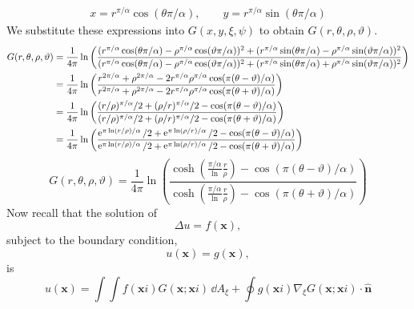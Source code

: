 {\begin{Solution}
\begin{gather*}
    x = r^{\pi/\alpha} \cos(\theta \pi / \alpha), \qquad
    y = r^{\pi/\alpha} \sin(\theta \pi / \alpha)
  \end{gather*}
  We substitute these expressions into $G(x,y,\xi,\psi)$ to obtain
  $G(r,\theta,\rho,\vartheta)$.
  \begin{align*}
    G(r,\theta,\rho,\vartheta)
    &= \frac{1}{4\pi} \ln \left(
      \frac{ ( r^{\pi/\alpha} \cos(\theta \pi/\alpha)
        - \rho^{\pi/\alpha} \cos(\vartheta \pi / \alpha) )^2
        + ( r^{\pi/\alpha} \sin(\theta \pi/\alpha)
        - \rho^{\pi/\alpha} \sin(\vartheta \pi / \alpha) )^2 }
      { ( r^{\pi/\alpha} \cos(\theta \pi/\alpha)
        - \rho^{\pi/\alpha} \cos(\vartheta \pi / \alpha) )^2
        + ( r^{\pi/\alpha} \sin(\theta \pi/\alpha)
        + \rho^{\pi/\alpha} \sin(\vartheta \pi / \alpha) )^2 } \right)\\
    &= \frac{1}{4\pi} \ln \left(
      \frac{ r^{2 \pi / \alpha} + \rho^{2 \pi / \alpha}
        - 2 r^{\pi/\alpha} \rho^{\pi/\alpha} 
        \cos( \pi(\theta-\vartheta) / \alpha ) }
      { r^{2 \pi / \alpha} + \rho^{2 \pi / \alpha}
        - 2 r^{\pi/\alpha} \rho^{\pi/\alpha} 
        \cos( \pi(\theta+\vartheta) / \alpha ) } \right) \\
    &= \frac{1}{4\pi} \ln \left(
      \frac{ (r/\rho)^{\pi/\alpha} / 2 + (\rho/r)^{\pi/\alpha} / 2
        - \cos( \pi(\theta-\vartheta) / \alpha ) }
      { (r/\rho)^{\pi/\alpha} / 2 + (\rho/r)^{\pi/\alpha} / 2
        - \cos( \pi(\theta+\vartheta) / \alpha ) } \right) \\
    &= \frac{1}{4\pi} \ln \left(
      \frac{ \mathop{\mathrm{e}}\nolimits^{\pi \ln(r/\rho) / \alpha} / 2 
        + \mathop{\mathrm{e}}\nolimits^{\pi \ln(\rho/r)/\alpha} / 2
        - \cos( \pi(\theta-\vartheta) / \alpha ) }
      { \mathop{\mathrm{e}}\nolimits^{\pi \ln(r/\rho) / \alpha} / 2 
        + \mathop{\mathrm{e}}\nolimits^{\pi \ln(\rho/r)/\alpha} / 2
        - \cos( \pi(\theta+\vartheta) / \alpha ) } \right) 
  \end{align*}
  \[
  \boxed{
    G(r,\theta,\rho,\vartheta) = \frac{1}{4\pi} \ln \left(
      \frac{ \cosh \left( \frac{\pi/\alpha} \ln \frac{r}{\rho} \right)
        - \cos( \pi(\theta-\vartheta) / \alpha ) }
      { \cosh \left( \frac{\pi/\alpha} \ln \frac{r}{\rho} \right)
        - \cos( \pi(\theta+\vartheta) / \alpha ) } \right)
    }
  \]
  Now recall that the solution of
  \[
  \Delta u = f(\mathbf{x}),
  \]
  subject to the boundary condition,
  \[
  u(\mathbf{x}) = g(\mathbf{x}),
  \]
  is
  \[
  u(\mathbf{x}) = \int \int f(\mathbf{x}i) G(\mathbf{x}; \mathbf{x}i) \,\dd A_\xi
  + \oint g(\mathbf{x}i) \nabla_\xi G(\mathbf{x}; \mathbf{x}i) \cdot \hat{\mathbf{n}} 
\]
\end{Solution}}
